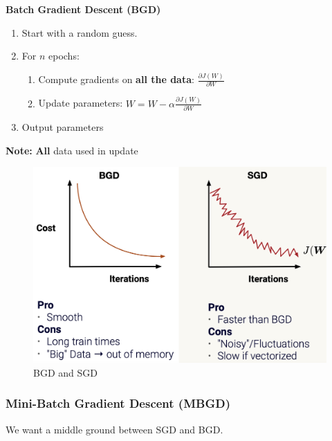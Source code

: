 \documentclass[11pt,a4paper]{article}
\begin{document}
\textbf{Batch Gradient Descent (BGD)}
\begin{enumerate}
    \item Start with a random guess.
    \item For $n$ epochs:
    \begin{enumerate}[1)]
        \item Compute gradients on
        \textbf{all the data}: $\frac{\partial J(W)}{\partial W}$
        \item Update parameters:
        $W=W-\alpha \frac{\partial J(W)}{\partial W}$
    \end{enumerate}
    \item Output parameters
\end{enumerate}
\textbf{Note:} \textbf{All} data used in update
\begin{center}\begin{figure}[htbp]
    \centering
    \includegraphics[scale=0.1]{BGDandSGD.png}
    \caption{BGD and SGD}
    \label{}
\end{figure}\end{center}

\subsubsection{Mini-Batch Gradient Descent (MBGD)}
We want a middle ground between SGD and BGD.
\end{document}
